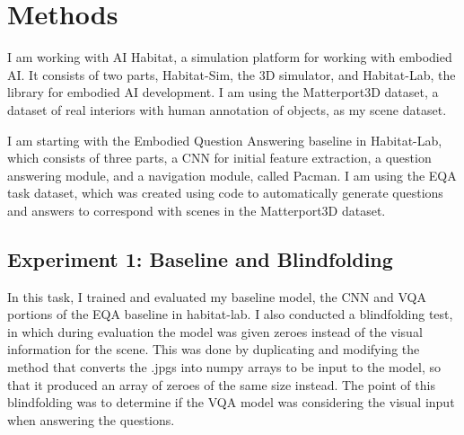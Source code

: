 \chapter{Methods}
I am working with AI Habitat, a simulation platform for working with embodied AI\cite{habitat19iccv}. It consists of two parts, Habitat-Sim, the 3D simulator, and Habitat-Lab, the library for embodied AI development. I am using the Matterport3D dataset, a dataset of real interiors with human annotation of objects, as my scene dataset\cite{matterport}.

I am starting with the Embodied Question Answering baseline in Habitat-Lab, which consists of three parts, a CNN for initial feature extraction, a question answering module, and a navigation module, called Pacman\cite{embodiedqa}. I am using the EQA task dataset, which was created using code to automatically generate questions and answers to correspond with scenes in the Matterport3D dataset\cite{eqa_matterport}. 
\section{Experiment 1: Baseline and Blindfolding}
In this task, I trained and evaluated my baseline model, the CNN and VQA portions of the EQA baseline in habitat-lab. I also conducted a blindfolding test, in which during evaluation the model was given zeroes instead of the visual information for the scene. This was done by duplicating and modifying the method that converts the .jpgs into numpy arrays to be input to the model, so that it produced an array of zeroes of the same size instead. The point of this blindfolding was to determine if the VQA model was considering the visual input when answering the questions.
